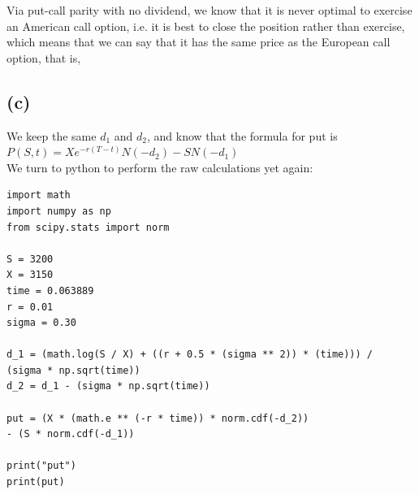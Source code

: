 \documentclass{article}
\begin{document}
{Via put-call parity with no dividend, we know that it is never optimal to exercise an American call option, i.e. it is best to close the position rather than exercise, which means that we can say that it has the same price as the European call option, that is, 

\subsection*{(c)}

We keep the same $d_1$ and $d_2$, and know that the formula for put is $P(S, t) = Xe^{-r(T - t)}N(-d_2) - SN(-d_1)$ \\
We turn to python to perform the raw calculations yet again:
\begin{verbatim}
import math
import numpy as np
from scipy.stats import norm

S = 3200
X = 3150
time = 0.063889
r = 0.01
sigma = 0.30

d_1 = (math.log(S / X) + ((r + 0.5 * (sigma ** 2)) * (time))) / 
(sigma * np.sqrt(time))
d_2 = d_1 - (sigma * np.sqrt(time))

put = (X * (math.e ** (-r * time)) * norm.cdf(-d_2)) 
- (S * norm.cdf(-d_1))

print("put")
print(put)
\end{verbatim}
\newpage
}
\end{document}
